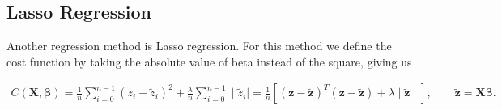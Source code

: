 \documentclass[norsk,a4paper,12pt]{scrartcl}
\renewcommand{\vec}[1]{\mathbf{#1}} %
\begin{document}
\subsection{Lasso Regression}
Another regression method is Lasso regression. For this method we define the cost function by taking the absolute value of beta instead of the square, giving us 

\begin{align*}
    C(\vec{X}, \boldsymbol{\beta})=\frac{1}{n} \sum_{i=0}^{n-1}\left(z_{i}-\tilde{z}_i\right)^{2} + \frac{\lambda}{n} \sum_{i=0}^{n-1}\mid \tilde{z}_i \mid =
    \frac{1}{n}\left[(\boldsymbol{z}-\boldsymbol{\tilde{z}})^{T}(\boldsymbol{z}-\boldsymbol{\tilde{z}}) + \lambda\mid \boldsymbol{\tilde{z}}\mid \right], \qquad \vec{\tilde{z}} = \vec{X}\boldsymbol{\beta}.
\end{align*}
\end{document}
